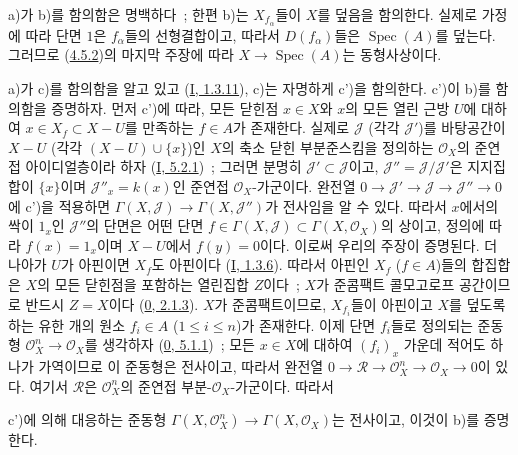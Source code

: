 a)가 b)를 함의함은 명백하다~; 한편 b)는 $X_{f_\alpha}$들이 $X$를
덮음을 함의한다. 실제로 가정에 따라 단면 $1$은 $f_\alpha$들의
선형결합이고, 따라서 $D(f_\alpha)$들은 $\operatorname{Spec}(A)$를
덮는다. 그러므로 (\hyperref[II.4.5.2-ko]{4.5.2})의 마지막 주장에
따라 $X\to\operatorname{Spec}(A)$는 동형사상이다.

a)가 c)를 함의함을 알고 있고 (\hyperref[I.1.3.11-ko]{I, 1.3.11}),
c)는 자명하게 c')을 함의한다. c')이 b)를 함의함을 증명하자. 먼저
c')에 따라, 모든 닫힌점 $x\in X$와 $x$의 모든 열린 근방 $U$에
대하여 $x\in X_f\subset X-U$를 만족하는 $f\in A$가 존재한다.
실제로 $\mathcal{J}$ (각각 $\mathcal{J}'$)를 바탕공간이 $X-U$
(각각 $(X-U)\cup\{x\}$)인 $X$의 축소 닫힌 부분준스킴을 정의하는
$\mathcal{O}_X$의 준연접 아이디얼층이라 하자
(\hyperref[I.5.2.1-ko]{I, 5.2.1})~; 그러면 분명히
$\mathcal{J}'\subset\mathcal{J}$이고,
$\mathcal{J}''=\mathcal{J}/\mathcal{J}'$은 지지집합이 $\{x\}$이며
$\mathcal{J}''_x=k(x)$인 준연접 $\mathcal{O}_X$-가군이다. 완전열
$0\to\mathcal{J}'\to\mathcal{J}\to\mathcal{J}''\to0$에 c')을
적용하면 $\Gamma(X,\mathcal{J})\to\Gamma(X,\mathcal{J}'')$가
전사임을 알 수 있다. 따라서 $x$에서의 싹이 $1_x$인
$\mathcal{J}''$의 단면은 어떤 단면
$f\in\Gamma(X,\mathcal{J})\subset\Gamma(X,\mathcal{O}_X)$의 상이고,
정의에 따라 $f(x)=1_x$이며 $X-U$에서 $f(y)=0$이다. 이로써 우리의
주장이 증명된다. 더 나아가 $U$가 아핀이면 $X_f$도 아핀이다
(\hyperref[I.1.3.6-ko]{I, 1.3.6}). 따라서 아핀인 $X_f$
($f\in A$)들의 합집합은 $X$의 모든 닫힌점을 포함하는 열린집합
$Z$이다~; $X$가 준콤팩트 콜모고로프 공간이므로 반드시 $Z=X$이다
(\hyperref[0.2.1.3-ko]{0, 2.1.3}). $X$가 준콤팩트이므로, $X_{f_i}$들이
아핀이고 $X$를 덮도록 하는 유한 개의 원소 $f_i\in A$
($1\leq i\leq n$)가 존재한다. 이제 단면 $f_i$들로 정의되는 준동형
$\mathcal{O}_X^n\to\mathcal{O}_X$를 생각하자
(\hyperref[0.5.1.1-ko]{0, 5.1.1})~; 모든 $x\in X$에 대하여
$(f_i)_x$ 가운데 적어도 하나가 가역이므로 이 준동형은 전사이고,
따라서 완전열
$0\to\mathcal{R}\to\mathcal{O}_X^n\to\mathcal{O}_X\to0$이 있다.
여기서 $\mathcal{R}$은 $\mathcal{O}_X^n$의 준연접
부분-$\mathcal{O}_X$-가군이다. 따라서


c')에 의해 대응하는 준동형
$\Gamma(X,\mathcal{O}_X^n)\to\Gamma(X,\mathcal{O}_X)$는 전사이고,
이것이 b)를 증명한다.

